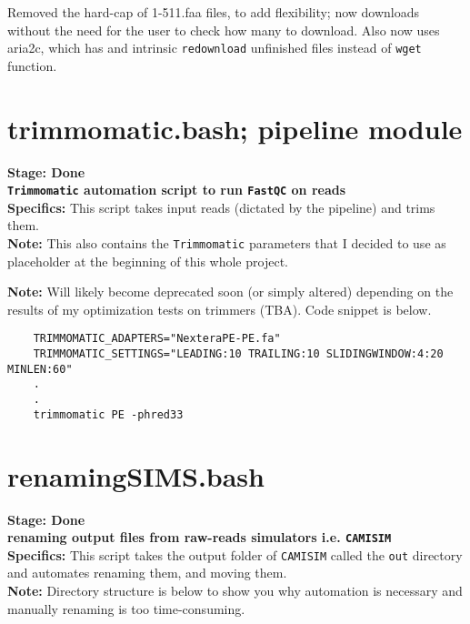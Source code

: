 \documentclass[11pt]{report}
\begin{document}
{\begin{tcolorbox}[title=Sept 20 2024 Update, coltitle=white]
Removed the hard-cap of 1-511.faa files, to add flexibility; now downloads without the need for the user to check how many to download. Also now uses aria2c, which has and intrinsic \texttt{redownload} unfinished files instead of \texttt{wget} function. 
\end{tcolorbox}


\linenumbers*
\section{trimmomatic.bash; pipeline module}
\textbf{Stage: Done} \\   
\textbf{\texttt{Trimmomatic} automation script to run \texttt{FastQC} on reads} \\
\textbf{Specifics:} This script takes input reads (dictated by the pipeline) and trims them. \\ 
\textbf{Note:} This also contains the \texttt{Trimmomatic} parameters that I decided to use as placeholder at the beginning of this whole project. \\

\begin{tcolorbox}
	\textbf{Note:} Will likely become deprecated soon (or simply altered) depending on the results of my optimization tests on trimmers (TBA). Code snippet is below. 
\end{tcolorbox}

\begin{verbatim}
	TRIMMOMATIC_ADAPTERS="NexteraPE-PE.fa"
	TRIMMOMATIC_SETTINGS="LEADING:10 TRAILING:10 SLIDINGWINDOW:4:20 MINLEN:60"
	.
	.
	trimmomatic PE -phred33
\end{verbatim}

\linenumbers*
\section{renamingSIMS.bash}
\textbf{Stage: Done} \\   
\textbf{renaming output files from raw-reads simulators i.e. \texttt{CAMISIM}} \\
\textbf{Specifics:} This script takes the output folder of \texttt{CAMISIM} called the \texttt{out} directory and automates renaming them, and moving them. \\ 
\textbf{Note:} Directory structure is below to show you why automation is necessary and manually renaming is too time-consuming. \\

}
\end{document}
